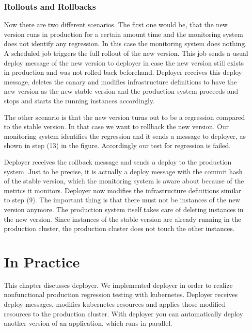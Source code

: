 \subsection{Rollouts and Rollbacks}

Now there are two different scenarios. The first one would be, that the new version runs
in production for a certain amount time and the monitoring system does not identify any
regression. In this case the monitoring system does nothing. A scheduled job triggers the
full rollout of the new version. This job sends a usual deploy message of the new version
to deployer in case the new version still exists in production and was not rolled back
beforehand. Deployer receives this deploy message, deletes the canary and modifies
infrastructure definitions to have the new version as the new stable version and the
production system proceeds and stops and starts the running instances accordingly.

The other scenario is that the new version turns out to be a regression compared to the
stable version. In that case we want to rollback the new version. Our monitoring system
identifies the regression and it sends a message to deployer, as shown in step (13) in the
figure. Accordingly our test for regression is failed.

Deployer receives the rollback message and sends a deploy to the production system. Just
to be precise, it is actually a deploy message with the commit hash of the stable version,
which the monitoring system is aware about because of the metrics it monitors. Deployer
now modifies the infrastructure definitions similar to step (9). The important thing is
that there must not be instances of the new version anymore. The production system itself
takes care of deleting instances in the new version. Since instances of the stable version
are already running in the production cluster, the production cluster does not touch the
other instances.

\chapter{In Practice}

This chapter discusses deployer. We implemented deployer in order to realize nonfunctional
production regression testing with kubernetes. Deployer receives deploy messages, modifies
kubernetes resources and applies those modified resources to the production cluster. With
deployer you can automatically deploy another version of an application, which runs in
parallel.


